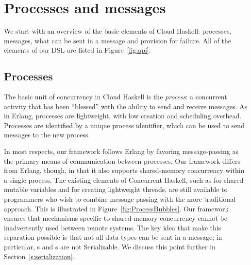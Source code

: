 \documentclass[preprint]{sigplanconf}
\begin{document}
\section{Processes and messages}
We start with an overview of the basic elements of Cloud Haskell:
processes, messages, what can be sent in a message and provision for failure.
All of the elements of our DSL are listed in Figure~\ref{fig:api}.
\subsection{Processes}
\label{Processes}
The basic unit of concurrency in Cloud Haskell is the {\em process}:  a concurrent activity that has been ``blessed'' with the ability to send and receive messages. As in Erlang, processes are lightweight, with low creation and scheduling overhead.  Processes are identified by a unique process identifier, which can be used to send messages to the new process.

In most respects, our framework follows Erlang by favoring message-passing as the primary means of communication between processes. Our framework differs from Erlang, though, in that it also supports shared-memory concurrency within a single process. The existing elements of Concurrent Haskell, such as  for shared mutable variables and  for creating lightweight threads, are still available to programmers who wish to combine message passing with the more traditional approach. This is illustrated in Figure~\ref{fig:ProcessBubbles}. Our framework ensures that mechanisms specific to shared-memory concurrency cannot be inadvertently used between remote systems.  The key idea that make this separation possible is that not all data types can be sent in a message; in particular, s and s are not Serializable.
We discuss this point further in Section~\ref{s:serialization}.
\end{document}
